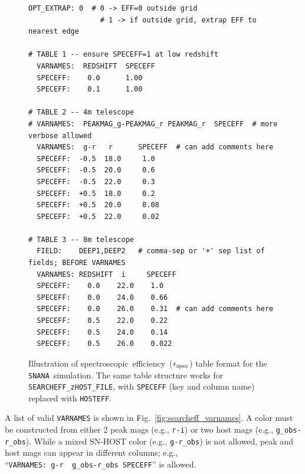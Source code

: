 \documentclass[12pt]{article}
\newcommand{\snana}{{\tt SNANA}}
\newcommand{\eff}{efficiency}
\newcommand{\simeffspec}{\epsilon_{\rm spec}}
\newcommand{\spec}{spectroscopic}
\begin{document}
{%
\begin{figure}[hb] 
\begin{center}
\caption{Illustration of \spec\ \eff\ ($\simeffspec$) table format for the \snana\ simulation.
         The same table structure works for {\tt SEARCHEFF\_zHOST\_FILE},
         with {\tt SPECEFF} (key and column name) replaced with {\tt HOSTEFF}. }
\medskip
\label{fig:speceff}
\begin{Verbatim}[frame=single]
  OPT_EXTRAP: 0  # 0 -> EFF=0 outside grid
                 # 1 -> if outside grid, extrap EFF to nearest edge

# TABLE 1 -- ensure SPECEFF=1 at low redshift
  VARNAMES:  REDSHIFT  SPECEFF
  SPECEFF:    0.0      1.00
  SPECEFF:    0.1      1.00

# TABLE 2 -- 4m telescope
# VARNAMES:  PEAKMAG_g-PEAKMAG_r PEAKMAG_r  SPECEFF  # more verbose allowed 
  VARNAMES:  g-r   r      SPECEFF  # can add comments here
  SPECEFF:  -0.5  18.0     1.0
  SPECEFF:  -0.5  20.0     0.6
  SPECEFF:  -0.5  22.0     0.3
  SPECEFF:  +0.5  18.0     0.2
  SPECEFF:  +0.5  20.0     0.08
  SPECEFF:  +0.5  22.0     0.02

# TABLE 3 -- 8m telescope
  FIELD:    DEEP1,DEEP2   # comma-sep or '+' sep list of fields; BEFORE VARNAMES
  VARNAMES: REDSHIFT  i     SPECEFF  
  SPECEFF:    0.0    22.0    1.0
  SPECEFF:    0.0    24.0    0.66
  SPECEFF:    0.0    26.0    0.31  # can add comments here
  SPECEFF:    0.5    22.0    0.22
  SPECEFF:    0.5    24.0    0.14
  SPECEFF:    0.5    26.0    0.022
\end{Verbatim} 
\end{center} 
\end{figure}

\clearpage

A list of valid {\tt VARNAMES} is shown in 
Fig.~\ref{fig:searcheff_varnames}. A color must be constructed
from either 2 peak mags (e.g., \verb|r-i|) or two host mags (e.g., \verb|g_obs-r_obs|).
While a mixed SN-HOST color (e.g., \verb|g-r_obs|) is not allowed,
peak and host mags can appear in different columns; e.g., \\
``\verb|VARNAMES: g-r  g_obs-r_obs SPECEFF|'' is allowed.


}
\end{document}
